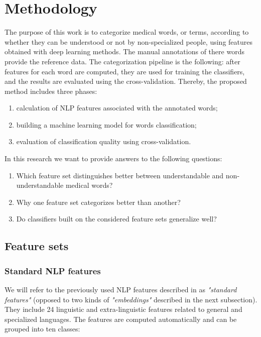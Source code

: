 \chapter{Methodology}
\label{ch:methodology}

The purpose of this work is to categorize medical words, or terms, according to whether they can be understood or not by non-specialized people, using features obtained with deep learning methods. The manual annotations of there words provide the reference data. The categorization pipeline is the following: after features for each word are computed, they are used for training the classifiers, and the results are evaluated using the
cross-validation.
Thereby, the proposed method includes three phases: 
\begin{enumerate}
    \item calculation of NLP features associated with the annotated words;
    \item building a machine learning model for words classification;
    \item evaluation of classification quality using cross-validation.
\end{enumerate}

In this research we want to provide answers to the following questions:
\begin{enumerate}
    \item Which feature set distinguishes better between understandable and non-understandable medical words?
    \item Why one feature set categorizes better than another?
    \item Do classifiers built on the considered feature sets generalize well? 
\end{enumerate}


\section{Feature sets}
\subsection{Standard NLP features}
\label{sec:standard-features}
We will refer to the previously used NLP features described in \citep{Grabar-PITR2014} as \textit{"standard features"} (opposed to two kinds of \textit{"embeddings"} described in the next subsection). They include 24 linguistic and extra-linguistic features related to general and specialized languages. The features are computed automatically and can be grouped into ten classes: 

